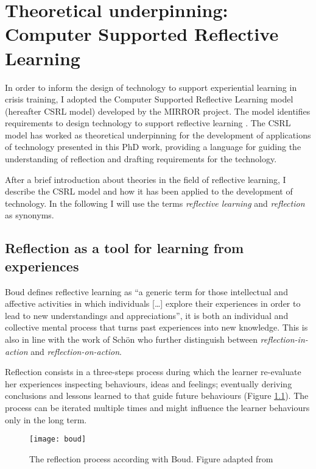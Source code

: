 \chapter{Theoretical underpinning: Computer Supported Reflective Learning}\label{csrl}


In order to inform the design of technology to support experiential learning in crisis training, I adopted the Computer Supported Reflective Learning model (hereafter CSRL model) developed by the MIRROR project. The model identifies requirements to design technology to support reflective learning \autocite{Krogstie:2013kf}. The CSRL model has worked as theoretical underpinning for the development of applications of technology presented in this PhD work, providing a language for guiding the understanding of reflection and drafting requirements for the technology.

After a brief introduction about theories in the field of reflective learning, I describe the CSRL model and how it has been applied to the development of technology. In the following I will use the terms \emph{reflective learning} and \emph{reflection} as synonyms.

\section{Reflection as a tool for learning from experiences}\label{reflection-as-a-tool-for-learning-from-experiences}

Boud \autocite*{boud1985reflection} defines reflective learning as ``a generic term for those intellectual and affective activities in which individuals {[}\ldots{}{]} explore their experiences in order to lead to new understandings and appreciations'', it is both an individual and collective mental process that turns past experiences into new knowledge. This is also in line with the work of Sch\"on \autocite*{Schon:1983ut} who further distinguish between \emph{reflection-in-action} and \emph{reflection-on-action}.

Reflection consists in a three-steps process during which the learner re-evaluate her experiences inspecting behaviours, ideas and feelings; eventually deriving conclusions and lessons learned to that guide future behaviours (Figure \ref{fig:boud-model}). The process can be iterated multiple times and might influence the learner behaviours only in the long term.
\begin{figure}
	[tbh] \centering 
	\texttt{[image: boud]} \caption{The reflection process according with Boud. Figure adapted from \protect\autocite{boud1985reflection}} \label{fig:boud-model} 
\end{figure}

